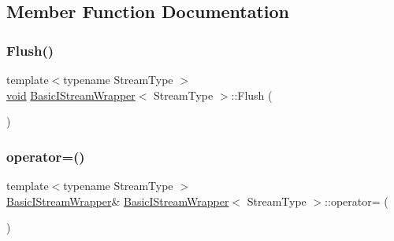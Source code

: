 \subsection{Member Function Documentation}
\mbox{\label{classBasicIStreamWrapper_a37d5e4cd8fdf3c83dad50737e95886a9}} 
\subsubsection{\texorpdfstring{Flush()}{Flush()}}
{\footnotesize\ttfamily template$<$typename Stream\+Type $>$ \\
\hyperlink{imgui__impl__opengl3__loader_8h_ac668e7cffd9e2e9cfee428b9b2f34fa7}{void} \hyperlink{classBasicIStreamWrapper}{Basic\+I\+Stream\+Wrapper}$<$ Stream\+Type $>$\+::Flush (\begin{DoxyParamCaption}{ }\end{DoxyParamCaption})\hspace{0.3cm}{\ttfamily [inline]}}

\mbox{\label{classBasicIStreamWrapper_a4a44440921c224c422ec211c9c20e701}} 
\subsubsection{\texorpdfstring{operator=()}{operator=()}}
{\footnotesize\ttfamily template$<$typename Stream\+Type $>$ \\
\hyperlink{classBasicIStreamWrapper}{Basic\+I\+Stream\+Wrapper}\& \hyperlink{classBasicIStreamWrapper}{Basic\+I\+Stream\+Wrapper}$<$ Stream\+Type $>$\+::operator= (\begin{DoxyParamCaption}\item[{const \hyperlink{classBasicIStreamWrapper}{Basic\+I\+Stream\+Wrapper}$<$ Stream\+Type $>$ \&}]{ }\end{DoxyParamCaption})\hspace{0.3cm}{\ttfamily [private]}}

\mbox{\label{classBasicIStreamWrapper_a0ad1488235b4786dd4f7a16e679dec88}} 
